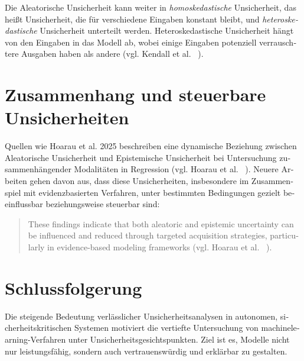 \begin{otherlanguage}{ngerman}
Die \gls{Aleatorische Unsicherheit} kann weiter in \textit{homoskedastische} Unsicherheit, das heißt Unsicherheit, die für verschiedene Eingaben konstant bleibt, und \textit{heteroskedastische} Unsicherheit unterteilt werden. Heteroskedastische Unsicherheit hängt von den Eingaben in das Modell ab, wobei einige Eingaben potenziell verrauschtere Ausgaben haben als andere (vgl. Kendall et al. ~\parencite[S. 2, Z. 1-5]{kendall2017}).

\section{Zusammenhang und steuerbare Unsicherheiten}

Quellen wie Hoarau et al. 2025 beschreiben eine dynamische Beziehung zwischen \gls{Aleatorische Unsicherheit} und \gls{Epistemische Unsicherheit} bei Untersuchung zusammenhängender Modalitäten in Regression (vgl. Hoarau et al. ~\parencite[S. 2, Z.10-14]{ArthurHoarau2025}). Neuere Arbeiten gehen davon aus, dass diese Unsicherheiten, insbesondere im Zusammenspiel mit evidenzbasierten Verfahren, unter bestimmten Bedingungen gezielt beeinflussbar beziehungsweise steuerbar sind: 

\begin{quote}
\glqq These findings indicate that both aleatoric and epistemic uncertainty can be influenced and reduced through targeted acquisition strategies, particularly in evidence-based modeling frameworks (vgl. Hoarau et al. ~\parencite[S.2, Z. 43-45]{ArthurHoarau2025}). \grqq{}
\end{quote}

\section{Schlussfolgerung}
Die steigende Bedeutung verlässlicher Unsicherheitsanalysen in autonomen, sicherheitskritischen Systemen motiviert die vertiefte Untersuchung von \gls{machinelearning}-Verfahren unter Unsicherheitsgesichtspunkten. Ziel ist es, Modelle nicht nur leistungsfähig, sondern auch vertrauenswürdig und erklärbar zu gestalten.



\end{otherlanguage}
